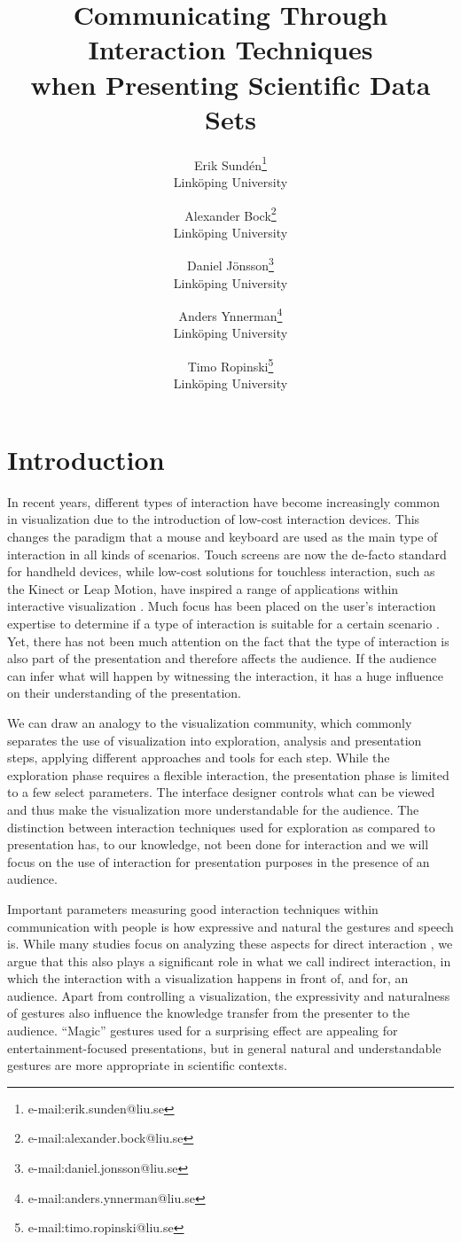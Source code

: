 \documentclass[review,journal]{vgtc}         %
\title{Communicating Through Interaction Techniques\\when Presenting Scientific Data Sets} %
\author{Erik Sund\'en\thanks{e-mail:erik.sunden@liu.se}\\ %
        \scriptsize Link{\"o}ping University %
\and Alexander Bock\thanks{e-mail:alexander.bock@liu.se}\\ %
			   \scriptsize Link{\"o}ping University %
\and Daniel J\"onsson\thanks{e-mail:daniel.jonsson@liu.se}\\ %
          \scriptsize Link{\"o}ping University %
\and Anders Ynnerman\thanks{e-mail:anders.ynnerman@liu.se}\\ %
          \scriptsize Link{\"o}ping University %
\and Timo Ropinski\thanks{e-mail:timo.ropinski@liu.se}\\ %
           \scriptsize Link{\"o}ping University }
\begin{document}
\maketitle

\section{Introduction}\label{sec:introduction}
In recent years, different types of interaction have become increasingly common in visualization due to the introduction of low-cost interaction devices.
This changes the paradigm that a mouse and keyboard are used as the main type of interaction in all kinds of scenarios.
Touch screens are now the de-facto standard for handheld devices, while low-cost solutions for touchless interaction, such as the Kinect or Leap Motion, have inspired a range of applications within interactive visualization \cite{zora82163, Jalaliniya:2013:TIM:2494091.2497332, OHaraGSPVMCCRDC14, 0724-4983}.
Much focus has been placed on the user's interaction expertise to determine if a type of interaction is suitable for a certain scenario \cite{DBLP:journals/tvcg/YiKSJ07}.
Yet, there has not been much attention on the fact that the type of interaction is also part of the presentation and therefore affects the audience.
If the audience can infer what will happen by witnessing the interaction, it has a huge influence on their understanding of the presentation.

We can draw an analogy to the visualization community, which commonly separates the use of visualization into exploration, analysis and presentation steps, applying different approaches and tools for each step.
While the exploration phase requires a flexible interaction, the presentation phase is limited to a few select parameters.
The interface designer controls what can be viewed and thus make the visualization more understandable for the audience.
The distinction between interaction techniques used for exploration as compared to presentation has, to our knowledge, not been done for interaction and we will focus on the use of interaction for presentation purposes in the presence of an audience.

Important parameters measuring good interaction techniques within communication with people is how expressive \cite{Brewster:2009:MIE:2227763.2227769} and natural the gestures and speech is.
While many studies focus on analyzing these aspects for direct interaction \cite{978-3-642-12552-2, Caridakis:2013:NIE:2504335.2504378}, we argue that this also plays a significant role in what we call indirect interaction, in which the interaction with a visualization happens in front of, and for, an audience.
Apart from controlling a visualization, the expressivity and naturalness of gestures also influence the knowledge transfer from the presenter to the audience.
``Magic'' gestures used for a surprising effect are appealing for entertainment-focused presentations, but in general natural and understandable gestures are more appropriate in scientific contexts.
\end{document}
